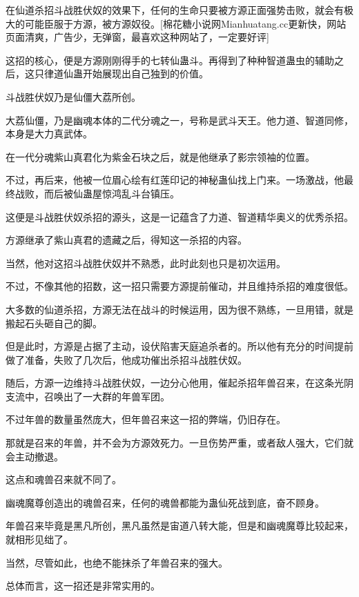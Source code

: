 
\begin{this_body}

在仙道杀招斗战胜伏奴的效果下，任何的生命只要被方源正面强势击败，就会有极大的可能臣服于方源，被方源奴役。[棉花糖小说网Mianhuatang.cc更新快，网站页面清爽，广告少，无弹窗，最喜欢这种网站了，一定要好评]

这招的核心，便是方源刚刚得手的七转仙蛊斗。再得到了种种智道蛊虫的辅助之后，这只律道仙蛊开始展现出自己独到的价值。

斗战胜伏奴乃是仙僵大荔所创。

大荔仙僵，乃是幽魂本体的二代分魂之一，号称是武斗天王。他力道、智道同修，本身是大力真武体。

在一代分魂紫山真君化为紫金石块之后，就是他继承了影宗领袖的位置。

不过，再后来，他被一位眉心绘有红莲印记的神秘蛊仙找上门来。一场激战，他最终战败，而后被仙蛊屋惊鸿乱斗台镇压。

这便是斗战胜伏奴杀招的源头，这是一记蕴含了力道、智道精华奥义的优秀杀招。

方源继承了紫山真君的遗藏之后，得知这一杀招的内容。

当然，他对这招斗战胜伏奴并不熟悉，此时此刻也只是初次运用。

不过，不像其他的招数，这一招只需要方源提前催动，并且维持杀招的难度很低。

大多数的仙道杀招，方源无法在战斗的时候运用，因为很不熟练，一旦用错，就是搬起石头砸自己的脚。

但是此时，方源是占据了主动，设伏陷害天庭追杀者的。所以他有充分的时间提前做了准备，失败了几次后，他成功催出杀招斗战胜伏奴。

随后，方源一边维持斗战胜伏奴，一边分心他用，催起杀招年兽召来，在这条光阴支流中，召唤出了一大群的年兽军团。

不过年兽的数量虽然庞大，但年兽召来这一招的弊端，仍旧存在。

那就是召来的年兽，并不会为方源效死力。一旦伤势严重，或者敌人强大，它们就会主动撤退。

这点和魂兽召来就不同了。

幽魂魔尊创造出的魂兽召来，任何的魂兽都能为蛊仙死战到底，奋不顾身。

年兽召来毕竟是黑凡所创，黑凡虽然是宙道八转大能，但是和幽魂魔尊比较起来，就相形见绌了。

当然，尽管如此，也绝不能抹杀了年兽召来的强大。

总体而言，这一招还是非常实用的。


\end{this_body}

